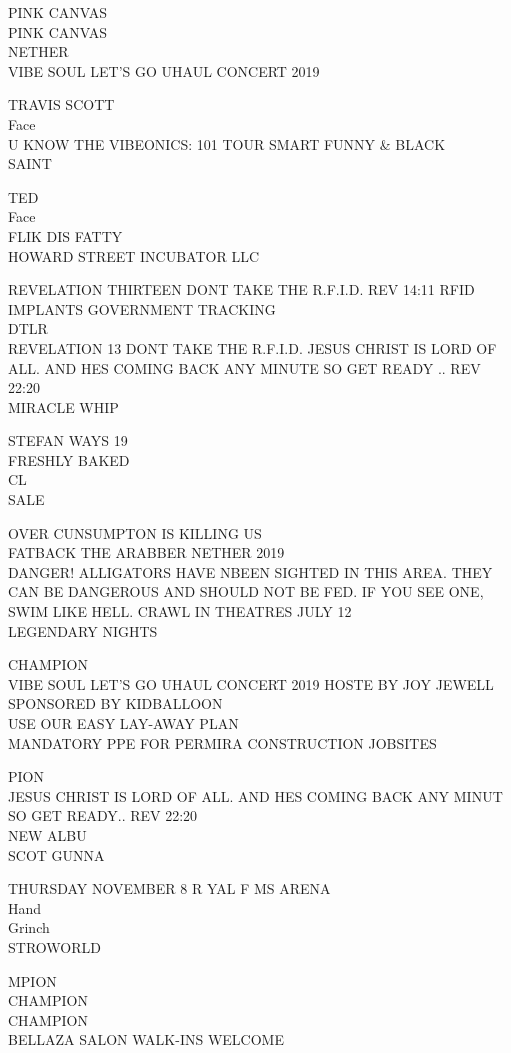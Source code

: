 \documentclass[10pt,letterpaper]{article}
\begin{document}
PINK CANVAS\\
PINK CANVAS\\
NETHER\\
VIBE SOUL LET'S GO UHAUL CONCERT 2019

TRAVIS SCOTT\\
Face\\
U KNOW THE VIBEONICS: 101 TOUR SMART FUNNY \& BLACK\\
SAINT

TED\\
Face\\
FLIK DIS FATTY\\
HOWARD STREET INCUBATOR LLC

REVELATION THIRTEEN DONT TAKE THE R.F.I.D. REV 14:11 RFID IMPLANTS GOVERNMENT TRACKING\\
DTLR\\
REVELATION 13 DONT TAKE THE R.F.I.D. JESUS CHRIST IS LORD OF ALL.  AND HES COMING BACK ANY MINUTE SO GET READY .. REV 22:20\\
MIRACLE WHIP

STEFAN WAYS 19\\
FRESHLY BAKED\\
CL\\
SALE

OVER CUNSUMPTON IS KILLING US\\
FATBACK THE ARABBER NETHER 2019\\
DANGER! ALLIGATORS HAVE NBEEN SIGHTED IN THIS AREA. THEY CAN BE DANGEROUS AND SHOULD NOT BE FED. IF YOU SEE ONE, SWIM LIKE HELL.  CRAWL IN THEATRES JULY 12\\
LEGENDARY NIGHTS

CHAMPION\\
VIBE SOUL LET'S GO UHAUL CONCERT 2019 HOSTE BY JOY JEWELL SPONSORED BY KIDBALLOON\\
USE OUR EASY LAY{-}AWAY PLAN\\
MANDATORY PPE FOR PERMIRA CONSTRUCTION JOBSITES

PION\\
JESUS CHRIST IS LORD OF ALL.  AND HES COMING BACK ANY MINUT SO GET READY.. REV 22:20\\
NEW ALBU\\
SCOT GUNNA

THURSDAY NOVEMBER 8 R YAL F MS ARENA\\
Hand\\
Grinch\\
STROWORLD

MPION\\
CHAMPION\\
CHAMPION\\
BELLAZA SALON WALK{-}INS WELCOME
\end{document}
